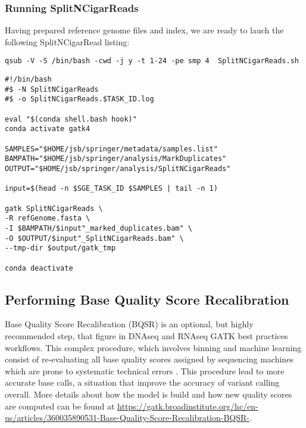 \subsubsection{Running SplitNCigarReads}

Having prepared reference genome files and index, we are ready to lauch the following SplitNCigarRead listing:


\begin{verbatim}
qsub -V -S /bin/bash -cwd -j y -t 1-24 -pe smp 4  SplitNCigarReads.sh
\end{verbatim}



\begin{verbatim}
#!/bin/bash
#$ -N SplitNCigarReads
#$ -o SplitNCigarReads.$TASK_ID.log
	
eval "$(conda shell.bash hook)"
conda activate gatk4
	
SAMPLES="$HOME/jsb/springer/metadata/samples.list"
BAMPATH="$HOME/jsb/springer/analysis/MarkDuplicates"
OUTPUT="$HOME/jsb/springer/analysis/SplitNCigarReads"
	
input=$(head -n $SGE_TASK_ID $SAMPLES | tail -n 1)

gatk SplitNCigarReads \
-R refGenome.fasta \
-I $BAMPATH/$input"_marked_duplicates.bam" \
-O $OUTPUT/$input"_SplitNCigarReads.bam" \
--tmp-dir $output/gatk_tmp
	
conda deactivate
\end{verbatim}



\subsection{Performing Base Quality Score Recalibration}

Base Quality Score Recalibration (BQSR) is an optional, but highly recommended step, that figure in DNAseq and RNAseq GATK best practices workflows. This complex procedure, which involves binning and machine learning consist of re-evaluating all base quality scores assigned by sequencing machines which are prone to systematic technical errors \cite{GATK_BaseQuality}. This procedure lead to more accurate base calls, a situation that improve the accuracy of variant calling overall. More details about how the model is build and how new quality scores are computed can be found at \href{https://gatk.broadinstitute.org/hc/en-us/articles/360035890531-Base-Quality-Score-Recalibration-BQSR-}{https://gatk.broadinstitute.org/hc/en-us/articles/360035890531-Base-Quality-Score-Recalibration-BQSR-}.

